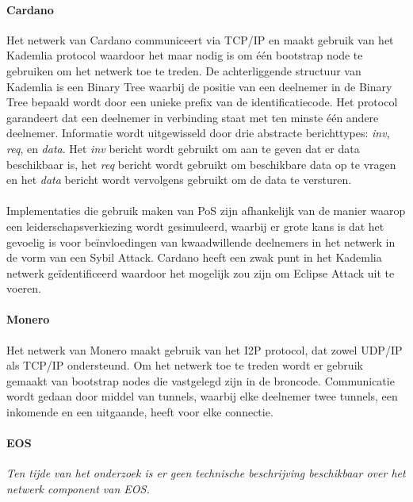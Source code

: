 \paragraph{Cardano} Het netwerk van Cardano communiceert via TCP/IP en maakt gebruik van het Kademlia protocol waardoor het maar nodig is om één bootstrap node te gebruiken om het netwerk toe te treden. De achterliggende structuur van Kademlia is een Binary Tree waarbij de positie van een deelnemer in de Binary Tree bepaald wordt door een unieke prefix van de identificatiecode. Het protocol garandeert dat een deelnemer in verbinding staat met ten minste één andere deelnemer. Informatie wordt uitgewisseld door drie abstracte berichttypes: \textit{inv}, \textit{req}, en \textit{data}. Het \textit{inv} bericht wordt gebruikt om aan te geven dat er data beschikbaar is, het \textit{req} bericht wordt gebruikt om beschikbare data op te vragen en het \textit{data} bericht wordt vervolgens gebruikt om de data te versturen. \\ \\ Implementaties die gebruik maken van \acrshort{PoS} zijn afhankelijk van de manier waarop een leiderschapsverkiezing wordt gesimuleerd, waarbij er grote kans is dat het gevoelig is voor beïnvloedingen van kwaadwillende deelnemers in het netwerk in de vorm van een Sybil Attack. Cardano heeft een zwak punt in het Kademlia netwerk geïdentificeerd waardoor het mogelijk zou zijn om Eclipse Attack uit te voeren.

\paragraph{Monero} Het netwerk van Monero maakt gebruik van het \acrfull{I2P} protocol, dat zowel UDP/IP als TCP/IP ondersteund. Om het netwerk toe te treden wordt er gebruik gemaakt van bootstrap nodes die vastgelegd zijn in de broncode. Communicatie wordt gedaan door middel van \Glspl{tunnel}, waarbij elke deelnemer twee \Glspl{tunnel}, een inkomende en een uitgaande, heeft voor elke connectie.

\paragraph{EOS} \textit{Ten tijde van het onderzoek is er geen technische beschrijving beschikbaar over het netwerk component van EOS.}




